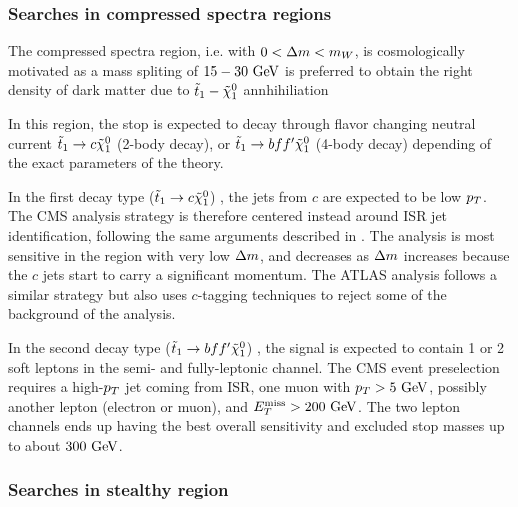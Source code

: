     \subsubsection{Searches in compressed spectra regions}

    The compressed spectra region, i.e. with $0 < \Delta m < m_{W}$, is cosmologically
    motivated as a mass spliting of $15-30~\text{GeV}$ is preferred to obtain the right density
    of dark matter due to $\tilde{t}_1-\tilde{\chi}_1^0$ annhihiliation \cite{TheLightStopWindow,SUSYBaryogenesis}

    In this region, the stop is expected to decay through flavor changing neutral current
    $\tilde{t}_1 \rightarrow c \tilde{\chi}_1^0$ (2-body decay), or $\tilde{t}_1 \rightarrow bff' \tilde{\chi}_1^0$
    (4-body decay) depending of the exact parameters of the theory.

    In the first decay type ($\tilde{t}_1 \rightarrow c \tilde{\chi}_1^0$) \cite{SUS-14-001, ATLASstopSearches},
    the jets from $c$ are expected to be low $p_T$. The CMS analysis strategy is therefore
    centered instead around ISR jet identification, following the same arguments described
    in . The analysis is most sensitive in the region with very
    low $\Delta m$, and decreases as $\Delta m$ increases because the $c$ jets start to carry
    a significant momentum. The ATLAS analysis follows a similar strategy but also uses
    $c$-tagging techniques to reject some of the background of the analysis.

    In the second decay type ($\tilde{t}_1 \rightarrow bff' \tilde{\chi}_1^0$) \cite{SUS-14-021, ATLASstopSearches},
    the signal is expected to contain 1 or 2 soft leptons in the semi- and fully-leptonic channel.
    The CMS event preselection
    requires a high-$p_T$ jet coming from ISR, one muon with $p_T > 5~\text{GeV}$, possibly another
    lepton (electron or muon), and $E_T^\text{miss} > 200~\text{GeV}$. The two lepton channels ends up having
    the best overall sensitivity and excluded stop masses up to about $300~\text{GeV}$.

    \subsubsection{Searches in stealthy region}

